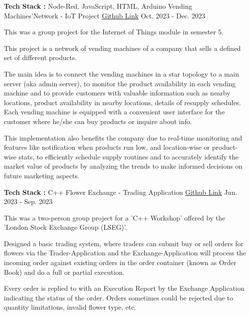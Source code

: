 \begin{cventries}
\cventry
{\textbf{Tech Stack :} Node-Red, JavaScript, HTML, Arduino} %
{Vending Machines'Network - IoT Project} %
{\href{https://github.com/VijthanKurrshanth/iot-project-vending-machine-instance}{Github Link}} %
{Oct. 2023 - Dec. 2023} %
{ %
\begin{cvitems}
\item {This was a group project for the Internet of Things module in semester 5.}
\item {This project is a network of vending machines of a company that sells a defined set of different products.}
\item {The main idea is to connect the vending machines in a star topology to a main server (aka admin server),
to monitor the product availability in each vending machine and to provide customers with valuable information such as nearby locations, product availability in nearby locations, details of resupply schedules. Each vending machine is equipped with a convenient user interface for the customer where he/she can buy
products or inquire about info.}
\item {This implementation also benefits the company due to real-time monitoring and features like notification when products run low, and location-wise or product-wise stats, to efficiently schedule supply routines and to accurately identify the market value of products by analyzing the trends to make informed decisions on future marketing aspects.}
\end{cvitems}
}


\cventry
{\textbf{Tech Stack :} C++} %
{Flower Exchange - Trading Application} %
{\href{https://github.com/VijthanKurrshanth/LSEG}{Github Link}} %
{Jun. 2023 - Sep. 2023} %
{ %
\begin{cvitems}
\item {This was a two-person group project for a 'C++ Workshop' offered by the 'London Stock Exchange Group (LSEG)'.}
\item {Designed a basic trading system, where traders can submit buy or sell orders for flowers via the Trader-Application and the Exchange-Application will process the incoming order against existing orders in the order container (known as Order Book) and do a full or partial execution.} 
\item {Every order is replied to with an Execution Report by the Exchange Application indicating the status of the order. Orders sometimes could be rejected due to quantity limitations, invalid flower type, etc.}
\end{cvitems}
}


\end{cventries}
